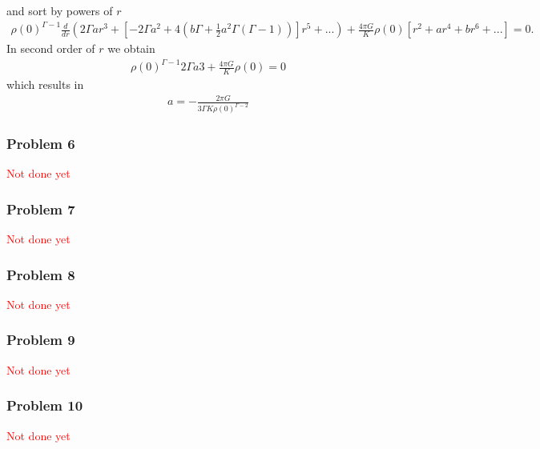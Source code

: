 \documentclass[10pt,a4paper]{book}
\theoremstyle{definition}
\begin{document}
and sort by powers of $r$
\begin{align}
    \rho(0)^{\Gamma-1}\frac{d}{dr}\left(2\Gamma ar^3+\left[-2\Gamma a^2+4\left(b\Gamma+\frac{1}{2}a^2\Gamma(\Gamma-1)\right)\right]r^5+...\right)+\frac{4\pi G}{K}\rho(0)\left[r^2+ar^4+br^6+...\right]=0.
\end{align}
In second order of $r$ we obtain
\begin{align}
    \rho(0)^{\Gamma-1}2\Gamma a3+\frac{4\pi G}{K}\rho(0)=0
\end{align}
which results in
\begin{align}
     a=-\frac{2\pi G}{3\Gamma K\rho(0)^{\Gamma-2}}
\end{align}

\subsubsection{Problem 6}
\textcolor{red}{Not done yet}

\subsubsection{Problem 7}
\textcolor{red}{Not done yet}
\subsubsection{Problem 8}
\textcolor{red}{Not done yet}
\subsubsection{Problem 9}
\textcolor{red}{Not done yet}
\subsubsection{Problem 10}
\textcolor{red}{Not done yet}
\end{document}

